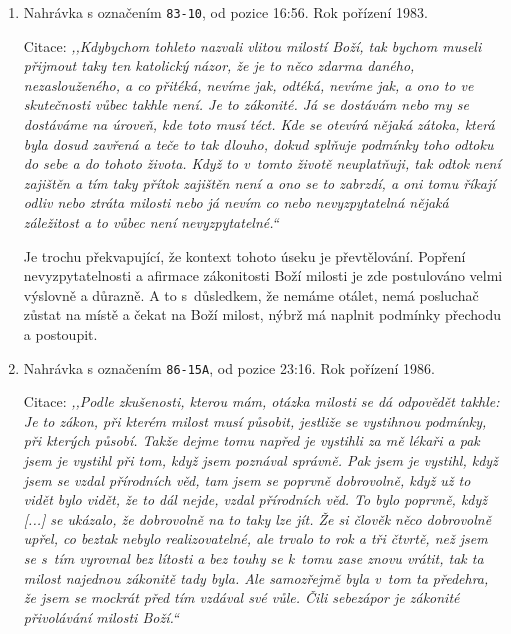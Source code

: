 \begin{enumerate}
{    Variace na předchozí výroky, kde se milost Boží podmiňuje zákonitostí.
    V~tomto případě se hovoří o dovolení ze strany člověka.
  }
  \item{
    Nahrávka s označením \texttt{83-10}, od pozice 16:56.
    Rok pořízení 1983.

    Citace: \textit{%
      ,,Kdybychom tohleto nazvali vlitou milostí Boží, tak bychom museli přijmout
      taky ten katolický názor, že je to něco zdarma daného, nezaslouženého, a
      co přitéká, nevíme jak, odtéká, nevíme jak, a ono to ve skutečnosti vůbec
      takhle není. Je to zákonité. Já se dostávám nebo my se dostáváme na
      úroveň, kde toto musí téct. Kde se otevírá nějaká zátoka, která byla dosud
      zavřená a teče to tak dlouho, dokud splňuje podmínky toho odtoku do sebe a
      do tohoto života. Když to v~tomto životě neuplatňuji, tak odtok není
      zajištěn a tím taky přítok zajištěn není a ono se to zabrzdí, a oni tomu
      říkají odliv nebo ztráta milosti nebo já nevím co nebo nevyzpytatelná
      nějaká záležitost a to vůbec není nevyzpytatelné.``
    }

    Je trochu překvapující, že kontext tohoto úseku je převtělování. Popření
    nevyzpytatelnosti a afirmace zákonitosti Boží milosti je zde postulováno
    velmi výslovně a důrazně. A to s~důsledkem, že nemáme otálet, nemá
    posluchač zůstat na místě a čekat na Boží milost, nýbrž má naplnit podmínky
    přechodu a postoupit.
  }
  \item{
    Nahrávka s označením \texttt{86-15A}, od pozice 23:16.
    Rok pořízení 1986.

    Citace: \textit{%
      ,,Podle zkušenosti, kterou mám, otázka milosti se dá odpovědět tak\-hle: Je to
      zákon, při kterém milost musí působit, jestliže se vystihnou podmínky, při
      kterých působí. Takže dejme tomu napřed je vystihli za mě lékaři a pak
      jsem je vystihl při tom, když jsem poznával správně. Pak jsem je vystihl,
      když jsem se vzdal přírodních věd, tam jsem se poprvně dobrovolně, když už
      to vidět bylo vidět, že to dál nejde, vzdal přírodních věd. To bylo
      poprvně, když [...] se ukázalo, že dobrovolně na to taky lze jít. Že si
      člověk něco dobrovolně upřel, co beztak nebylo realizovatelné, ale trvalo
      to rok a tři čtvrtě, než jsem se s~tím vyrovnal bez lítosti a bez touhy se
      k~tomu zase znovu vrátit, tak ta milost najednou zákonitě tady byla. Ale
      samozřejmě byla v~tom ta předehra, že jsem se mockrát před tím vzdával své
      vůle. Čili sebezápor je zákonité přivolávání milosti Boží.``
    }

}
\end{enumerate}
